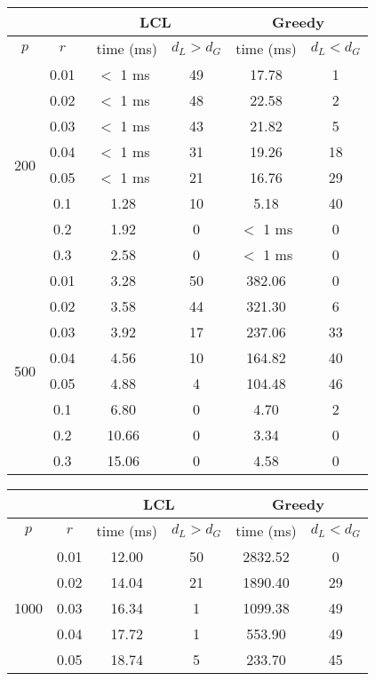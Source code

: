 \begin{tabular}{| c | c | c | c | c | c | }
	\hline
	& & \multicolumn{2}{c|}{LCL} & \multicolumn{2}{c|}{Greedy}\\
	\hline
	$p$ & $r$ & \ time (ms) & $d_{L} > d_{G}$ & time (ms) &  $d_{L} < d_{G}$ \\
	\hline
	\multirow{8}{*}{200} & 0.01 & $<$ 1 ms & 49 & 17.78 & 1\\
	\cline{2-6}
	& 0.02 & $<$ 1 ms & 48 & 22.58 & 2\\
	\cline{2-6}
	& 0.03 & $<$ 1 ms & 43 & 21.82 & 5\\
	\cline{2-6}
	& 0.04 & $<$ 1 ms & 31 & 19.26 & 18\\
	\cline{2-6}
	& 0.05 & $<$ 1 ms & 21 & 16.76 & 29\\
	\cline{2-6}
	& 0.1 & 1.28 & 10 & 5.18 & 40\\
	\cline{2-6}
	& 0.2 & 1.92 & 0 & $<$ 1 ms & 0\\
	\cline{2-6}
	& 0.3 & 2.58 & 0 & $<$ 1 ms & 0\\
	\hline
	\multirow{8}{*}{500} & 0.01 & 3.28 & 50 & 382.06 & 0\\
	\cline{2-6}
	& 0.02 & 3.58 & 44 & 321.30 & 6\\
	\cline{2-6}
	& 0.03 & 3.92 & 17 & 237.06 & 33\\
	\cline{2-6}
	& 0.04 & 4.56 & 10 & 164.82 & 40\\
	\cline{2-6}
	& 0.05 & 4.88 & 4 & 104.48 & 46\\
	\cline{2-6}
	& 0.1 & 6.80 & 0 & 4.70 & 2\\
	\cline{2-6}
	& 0.2 & 10.66 & 0 & 3.34 & 0\\
	\cline{2-6}
	& 0.3 & 15.06 & 0 & 4.58 & 0\\
	\hline
\end{tabular}\begin{tabular}{| c | c | c | c | c | c | }
		\hline
		& & \multicolumn{2}{c|}{LCL} & \multicolumn{2}{c|}{Greedy}\\
		\hline
	$p$ & $r$ & time (ms) & $d_{L} > d_{G}$ & time (ms) &  $d_{L} < d_{G}$ \\
	\hline
	\multirow{8}{*}{1000} & 0.01 & 12.00 & 50 & 2832.52 & 0\\
	\cline{2-6}
	& 0.02 & 14.04 & 21 & 1890.40 & 29\\
	\cline{2-6}
	& 0.03 & 16.34 & 1 & 1099.38 & 49\\
	\cline{2-6}
	& 0.04 & 17.72 & 1 & 553.90 & 49\\
	\cline{2-6}
	& 0.05 & 18.74 & 5 & 233.70 & 45\\

\end{tabular}
